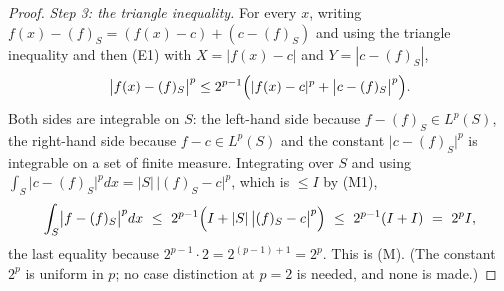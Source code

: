 \begin{proof}
\emph{Step 3: the triangle inequality.}  For every $x$, writing
$f(x)-(f)_S=(f(x)-c)+(c-(f)_S)$ and using the triangle inequality and then (E1)
with $X=|f(x)-c|$ and $Y=|c-(f)_S|$,
\[
\bigl|f(x)-(f)_S\bigr|^{p}
\le2^{p-1}\Bigl(|f(x)-c|^{p}+\bigl|c-(f)_S\bigr|^{p}\Bigr).
\]
Both sides are integrable on $S$: the left-hand side because
$f-(f)_S\in L^p(S)$, the right-hand side because $f-c\in L^p(S)$ and the
constant $\bigl|c-(f)_S\bigr|^{p}$ is integrable on a set of finite measure.
Integrating over $S$ and using $\int_S\bigl|c-(f)_S\bigr|^{p}dx
=|S|\,\bigl|(f)_S-c\bigr|^{p}$, which is $\le I$ by (M1),
\[
\int_S\bigl|f-(f)_S\bigr|^{p}dx
\ \le\ 2^{p-1}\Bigl(I+|S|\,\bigl|(f)_S-c\bigr|^{p}\Bigr)
\ \le\ 2^{p-1}(I+I)
\ =\ 2^{p}I ,
\]
the last equality because $2^{p-1}\cdot2=2^{(p-1)+1}=2^{p}$.  This is (M).
(The constant $2^{p}$ is uniform in $p$; no case distinction at $p=2$ is needed,
and none is made.)
\end{proof}
